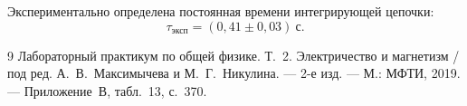\documentclass[12pt,a4paper]{article}
\begin{document}
Экспериментально определена постоянная времени интегрирующей цепочки:
\[
 \tau_{\text{эксп}}=(0{,}41\pm0{,}03)\ \text{с}.
\]



\begin{thebibliography}{9}
Лабораторный практикум по общей физике.
Т.~2. Электричество и магнетизм / под ред.
А.~В.~Максимычева и М.~Г.~Никулина. ---
2-е изд. --- М.: МФТИ, 2019. ---
Приложение~В, табл.~13, с.~370.
\end{thebibliography}
\end{document}
